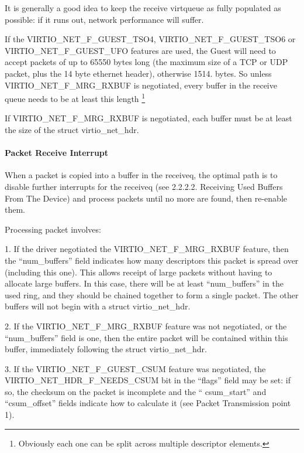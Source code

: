 It is generally a good idea to keep the receive virtqueue as
fully populated as possible: if it runs out, network performance
will suffer.

If the VIRTIO_NET_F_GUEST_TSO4, VIRTIO_NET_F_GUEST_TSO6 or
VIRTIO_NET_F_GUEST_UFO features are used, the Guest will need to
accept packets of up to 65550 bytes long (the maximum size of a
TCP or UDP packet, plus the 14 byte ethernet header), otherwise
1514. bytes. So unless VIRTIO_NET_F_MRG_RXBUF is negotiated, every
buffer in the receive queue needs to be at least this length 
\footnote{Obviously each one can be split across multiple descriptor
elements.
}

If VIRTIO_NET_F_MRG_RXBUF is negotiated, each buffer must be at
least the size of the struct virtio_net_hdr.

\paragraph{Packet Receive Interrupt}\label{sec:Device Types / Network Device / Device Operation / Setting Up Receive Buffers / Packet Receive Interrupt}

When a packet is copied into a buffer in the receiveq, the
optimal path is to disable further interrupts for the receiveq
(see 2.2.2.2. Receiving Used Buffers From The Device) and process
packets until no more are found, then re-enable them.

Processing packet involves:

1. If the driver negotiated the VIRTIO_NET_F_MRG_RXBUF feature,
  then the “num_buffers” field indicates how many descriptors
  this packet is spread over (including this one). This allows
  receipt of large packets without having to allocate large
  buffers. In this case, there will be at least “num_buffers” in
  the used ring, and they should be chained together to form a
  single packet. The other buffers will not begin with a struct
  virtio_net_hdr.

2. If the VIRTIO_NET_F_MRG_RXBUF feature was not negotiated, or
  the “num_buffers” field is one, then the entire packet will be
  contained within this buffer, immediately following the struct
  virtio_net_hdr.

3. If the VIRTIO_NET_F_GUEST_CSUM feature was negotiated, the
  VIRTIO_NET_HDR_F_NEEDS_CSUM bit in the “flags” field may be
  set: if so, the checksum on the packet is incomplete and the “
  csum_start” and “csum_offset” fields indicate how to calculate
  it (see Packet Transmission point 1).

